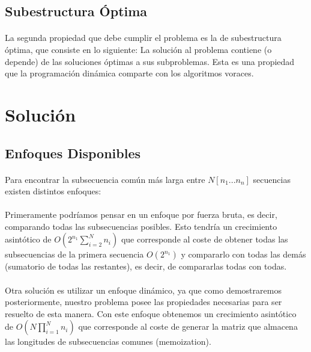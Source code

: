\documentclass{article}
\begin{document}
	\subsection{Subestructura Óptima}
	
		\paragraph{}
		La segunda propiedad que debe cumplir el problema es la de subestructura óptima, que consiste en lo siguiente: La solución al problema contiene (o depende) de las soluciones óptimas a sus subproblemas. Esta es una propiedad que la programación dinámica comparte con los algoritmos voraces.

\section{Solución}

	\subsection{Enfoques Disponibles}
	
		\paragraph{}
		Para encontrar la subsecuencia común más larga entre $N[n_{1}...n_{n}]$ secuencias existen distintos enfoques:

		\paragraph{}
		 Primeramente podríamos pensar en un enfoque por fuerza bruta, es decir, comparando todas las subsecuencias posibles. Esto tendría un crecimiento asintótico de $O(2^{n_{1}}\sum_{i = 2}^{N}n_{i})$ que corresponde al coste de obtener todas las subsecuencias de la primera secuencia $O(2^{n_{1}})$ y compararlo con todas las demás  (sumatorio de todas las restantes), es decir, de compararlas todas con todas.

		\paragraph{}
		 Otra solución es utilizar un enfoque dinámico, ya que como demostraremos posteriormente, nuestro problema posee las propiedades necesarias para ser resuelto de esta manera. Con este enfoque obtenemos un crecimiento asintótico de  $O(N\prod_{i = 1}^{N}n_{i})$ que corresponde al coste de generar la matriz que almacena las longitudes de subsecuencias comunes (memoization).
\end{document}
